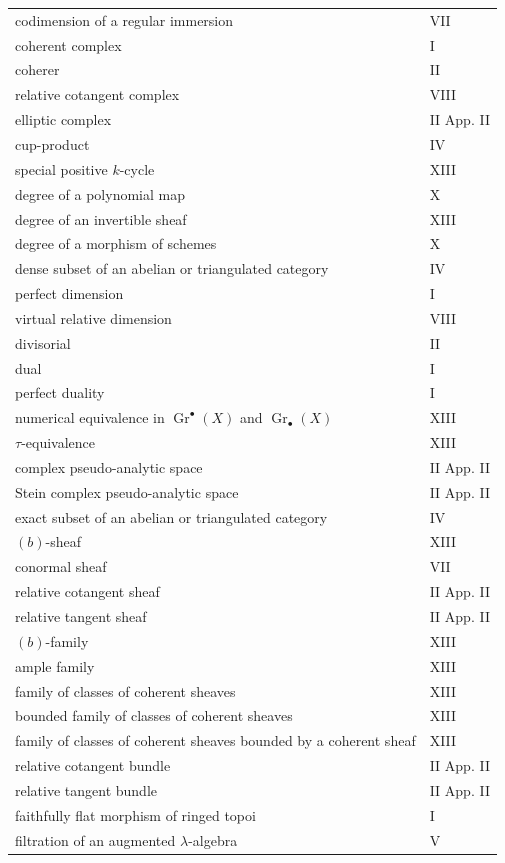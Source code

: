 \documentclass[12pt]{article}
\newcommand{\Gr}{\operatorname{Gr}}
\begin{document}
\begin{longtable}{p{8.5cm}l}
codimension of a regular immersion & VII\\
coherent complex & I\\
coherer & II\\
relative cotangent complex & VIII\\
elliptic complex & II App. II\\
cup-product & IV\\
special positive $k$-cycle & XIII\\
degree of a polynomial map & X\\
degree of an invertible sheaf & XIII\\
degree of a morphism of schemes & X\\
dense subset of an abelian or triangulated category & IV\\
perfect dimension & I\\
virtual relative dimension & VIII\\
divisorial & II\\
dual & I\\
perfect duality & I\\
numerical equivalence in $\Gr^\bullet(X)$ and $\Gr_\bullet(X)$ & XIII\\
$\tau$-equivalence & XIII\\
complex pseudo-analytic space & II App. II\\
Stein complex pseudo-analytic space & II App. II\\
exact subset of an abelian or triangulated category & IV\\
$(b)$-sheaf & XIII\\
conormal sheaf & VII\\
relative cotangent sheaf & II App. II\\
relative tangent sheaf & II App. II\\
$(b)$-family & XIII\\
ample family & XIII\\
family of classes of coherent sheaves & XIII\\
bounded family of classes of coherent sheaves & XIII\\
family of classes of coherent sheaves bounded by a coherent sheaf & XIII\\
relative cotangent bundle & II App. II\\
relative tangent bundle & II App. II\\
faithfully flat morphism of ringed topoi & I\\
filtration of an augmented $\lambda$-algebra & V\\

\end{longtable}
\end{document}
